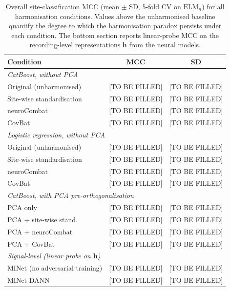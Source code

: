 \documentclass[preprint,12pt]{elsarticle}
\begin{document}
\begin{table}[htbp]
  \centering
  \caption{Overall site-classification MCC (mean $\pm$ SD, 5-fold CV
    on $\mathrm{ELM}_n$) for all harmonisation conditions.
    Values above the unharmonised baseline quantify the degree to
    which the harmonisation paradox persists under each condition.
    The bottom section reports linear-probe MCC on the recording-level
    representations $\mathbf{h}$ from the neural models.}
  \label{tab:site_class_harmonisation}
  \begin{tabular}{lcc}
    \toprule
    \textbf{Condition} & \textbf{MCC} & \textbf{SD} \\
    \midrule
    \multicolumn{3}{l}{\textit{CatBoost, without PCA}} \\
    \quad Original (unharmonised)        & [TO BE FILLED] & [TO BE FILLED] \\
    \quad Site-wise standardisation      & [TO BE FILLED] & [TO BE FILLED] \\
    \quad neuroCombat                    & [TO BE FILLED] & [TO BE FILLED] \\
    \quad CovBat                         & [TO BE FILLED] & [TO BE FILLED] \\
    \midrule
    \multicolumn{3}{l}{\textit{Logistic regression, without PCA}} \\
    \quad Original (unharmonised)        & [TO BE FILLED] & [TO BE FILLED] \\
    \quad Site-wise standardisation      & [TO BE FILLED] & [TO BE FILLED] \\
    \quad neuroCombat                    & [TO BE FILLED] & [TO BE FILLED] \\
    \quad CovBat                         & [TO BE FILLED] & [TO BE FILLED] \\
    \midrule
    \multicolumn{3}{l}{\textit{CatBoost, with PCA pre-orthogonalisation}} \\
    \quad PCA only                       & [TO BE FILLED] & [TO BE FILLED] \\
    \quad PCA + site-wise stand.         & [TO BE FILLED] & [TO BE FILLED] \\
    \quad PCA + neuroCombat              & [TO BE FILLED] & [TO BE FILLED] \\
    \quad PCA + CovBat                   & [TO BE FILLED] & [TO BE FILLED] \\
    \midrule
    \multicolumn{3}{l}{\textit{Signal-level (linear probe on $\mathbf{h}$)}} \\
    \quad MINet (no adversarial training) & [TO BE FILLED] & [TO BE FILLED] \\
    \quad MINet-DANN                      & [TO BE FILLED] & [TO BE FILLED] \\
    \bottomrule
  \end{tabular}
\end{table}
\end{document}
